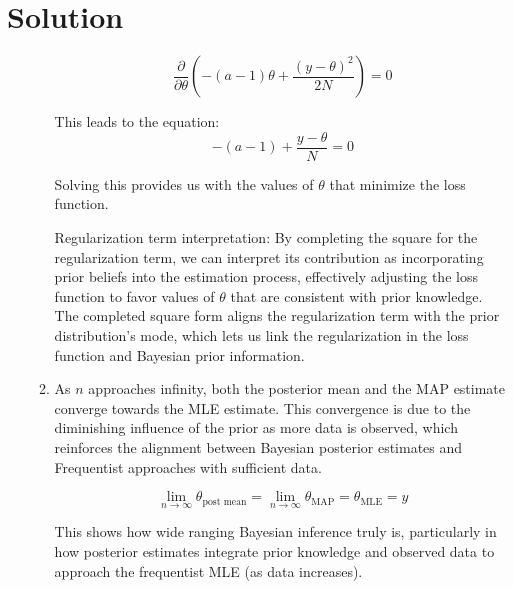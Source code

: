 \documentclass[submit]{harvardml}
\newenvironment{answer}
  {\section*{Solution}}
{}
\begin{document}
\begin{answer}
\begin{enumerate}
\begin{enumerate}
\[
\frac{\partial}{\partial \theta}\left(-(a - 1)\theta + \frac{(y - \theta)^2}{2N}\right) = 0
\]

This leads to the equation:
\[
-(a - 1) + \frac{y - \theta}{N} = 0
\]

Solving this provides us with the values of \(\theta\) that minimize the loss function.


              Regularization term interpretation: By completing the square for the regularization term, we can interpret its contribution as incorporating prior beliefs into the estimation process, effectively adjusting the loss function to favor values of \(\theta\) that are consistent with prior knowledge. The completed square form aligns the regularization term with the prior distribution's mode, which lets us link the regularization in the loss function and Bayesian prior information.
        \item As \(n\) approaches infinity, both the posterior mean and the MAP estimate converge towards the MLE estimate. This convergence is due to the diminishing influence of the prior as more data is observed, which reinforces the alignment between Bayesian posterior estimates and Frequentist approaches with sufficient data.

\[
\lim_{n \rightarrow \infty} \theta_{\text{post mean}} = \lim_{n \rightarrow \infty} \theta_{\text{MAP}} = \theta_{\text{MLE}} = y
\]

This shows how wide ranging Bayesian inference truly is, particularly in how posterior estimates integrate prior knowledge and observed data to  approach the frequentist MLE (as data increases). 

      \end{enumerate}

  \end{enumerate}
\end{answer}


\newpage

\end{document}
